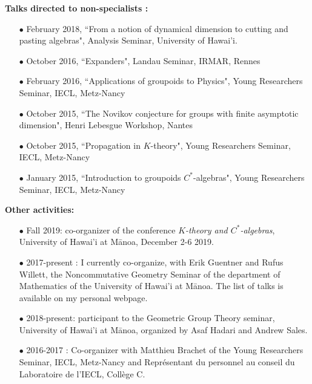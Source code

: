 \documentclass[a4paper,11pt]{article}
\newcommand\espace{\vrule height 20pt width 0pt}
\begin{document}
\textbf{Talks directed to non-specialists :}\\

\begin{itemize}
\item[$\bullet$] February 2018, ``From a notion of dynamical dimension to cutting and pasting algebras", Analysis Seminar, University of Hawai'i.
\item[$\bullet$] October 2016, ``Expanders", Landau Seminar, IRMAR, Rennes %
\item[$\bullet$] February 2016, ``Applications of groupoids to Physics", Young Researchers Seminar, IECL, Metz-Nancy
\item[$\bullet$] October 2015, ``The Novikov conjecture for groups with finite asymptotic dimension", Henri Lebesgue Workshop, Nantes
\item[$\bullet$] October 2015, ``Propagation in $K$-theory", Young Researchers Seminar, IECL, Metz-Nancy
\item[$\bullet$] January 2015, ``Introduction to groupoids $C^*$-algebras", Young Researchers Seminar, IECL, Metz-Nancy
\end{itemize}
\espace

\textbf{Other activities:} 
\begin{itemize}
\item[$\bullet$] Fall 2019: co-organizer of the conference \textit{$K$-theory and $C^*$-algebras}, University of Hawai'i at M\={a}noa, December 2-6 2019. 
\item[$\bullet$] 2017-present : I currently co-organize, with Erik Guentner and Rufus Willett, the Noncommutative Geometry Seminar of the department of Mathematics of the University of Hawai'i at M\={a}noa. The list of talks is available on my personal webpage.
\item[$\bullet$] 2018-present: participant to the Geometric Group Theory seminar, University of Hawai'i at M\={a}noa, organized by Asaf Hadari and Andrew Sales.
\item[$\bullet$] 2016-2017 : Co-organizer with Matthieu Brachet of the Young Researchers Seminar, IECL, Metz-Nancy and Représentant du personnel au conseil du Laboratoire de l'IECL, Collège C.
\end{itemize}
\end{document}
